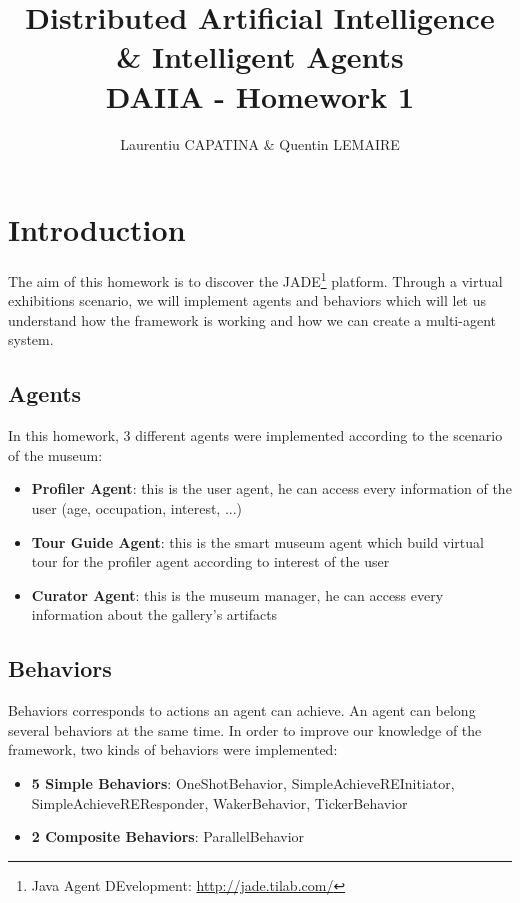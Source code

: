 \documentclass[a4paper,11pt]{article}
\title{Distributed Artificial Intelligence \& Intelligent Agents \\ DAIIA - Homework 1}
\author{Laurentiu CAPATINA \& Quentin LEMAIRE}
\begin{document}
  \maketitle %

  \section{Introduction}
  
  The aim of this homework is to discover the JADE\footnote{Java Agent DEvelopment: \href{http://jade.tilab.com/}{http://jade.tilab.com/}} platform. 
  Through a virtual exhibitions scenario, we will implement agents and behaviors which will let us understand how the framework is working 
  and how we can create a multi-agent system.
  
  
  \subsection{Agents}
  
  In this homework, 3 different agents were implemented according to the scenario of the museum:
  \begin{itemize}[label=--]
   \item \textbf{Profiler Agent}: this is the user agent, he can access every information of the user (age, occupation, interest, ...)
   \item \textbf{Tour Guide Agent}: this is the smart museum agent which build virtual tour for the profiler agent according to interest of the user
   \item \textbf{Curator Agent}: this is the museum manager, he can access every information about the gallery's artifacts
  \end{itemize}

  
  \subsection{Behaviors}
  
  Behaviors corresponds to actions an agent can achieve. An agent can belong several behaviors at the same time. In order to improve our knowledge of 
  the framework, two kinds of behaviors were implemented:
  \begin{itemize}[label=--]
   \item \textbf{5 Simple Behaviors}: OneShotBehavior, SimpleAchieveREInitiator, SimpleAchieveREResponder, WakerBehavior, TickerBehavior
   \item \textbf{2 Composite Behaviors}: ParallelBehavior %
  \end{itemize}
  
\end{document}
